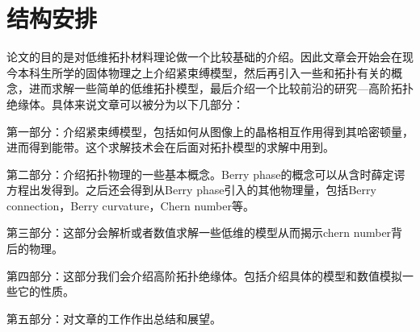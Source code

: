  \section{结构安排}
 论文的目的是对低维拓扑材料理论做一个比较基础的介绍。因此文章会开始会在现今本科生所学的固体物理之上介绍紧束缚模型，然后再引入一些和拓扑有关的概念，进而求解一些简单的低维拓扑模型，最后介绍一个比较前沿的研究—高阶拓扑绝缘体。具体来说文章可以被分为以下几部分：
 
第一部分：介绍紧束缚模型，包括如何从图像上的晶格相互作用得到其哈密顿量，进而得到能带。这个求解技术会在后面对拓扑模型的求解中用到。

第二部分：介绍拓扑物理的一些基本概念。Berry phase的概念可以从含时薛定谔方程出发得到。之后还会得到从Berry phase引入的其他物理量，包括Berry connection，Berry curvature，Chern number等。

第三部分：这部分会解析或者数值求解一些低维的模型从而揭示chern number背后的物理。

第四部分：这部分我们会介绍高阶拓扑绝缘体。包括介绍具体的模型和数值模拟一些它的性质。

第五部分：对文章的工作作出总结和展望。

